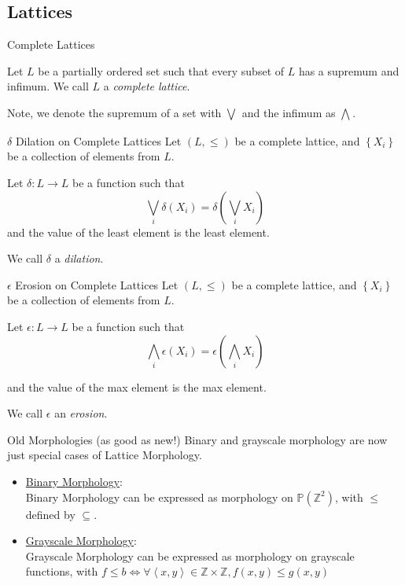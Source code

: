 \documentclass{beamer}
\newcommand{\set}[1]{\left\lbrace #1 \right\rbrace}
\newcommand{\tuple}[1]{\left\langle #1 \right\rangle}
\newcommand{\power}[1]{\mathbb{P}\left(#1\right)}
\newcommand{\integers}{\mathbb{Z}}
\newcommand{\func}[3]{#1:#2\rightarrow#3}
\newcommand{\meet}[1]{\displaystyle\bigwedge_{#1}}
\newcommand{\join}[1]{\displaystyle\bigvee_{#1}}
\newcommand{\unidilate}{\delta}
\newcommand{\unierode}{\epsilon}
\newcommand{\partialless}{\leqslant}
\begin{document}
\subsection{Lattices}
\begin{frame}{Complete Lattices}
  \begin{definition}
    Let $L$ be a partially ordered set such that 
    every subset of $L$ has a supremum and infimum. 
    We call $L$ a \emph{complete lattice}.
  \end{definition}
  Note, we denote the supremum of a set with $\join{}$ and
  the infimum as $\meet{}$.
\end{frame}

\begin{frame}{$\unidilate$ Dilation on Complete Lattices}
   Let $(L, \partialless)$ be a complete lattice, and $\set{X_i}$ be
   a collection of elements from $L$.
   \begin{definition}
     Let $\func{\unidilate}{L}{L}$ be a function such that
       $$\join{i} \unidilate(X_i) = 
         \unidilate\left(\join{i}X_i\right)$$
     and the value of the least element is the least element.


     We call $\unidilate$ a \emph{dilation}.
   \end{definition}
\end{frame}

\begin{frame}{$\unierode$ Erosion on Complete Lattices}
   Let $(L, \partialless)$ be a complete lattice, and $\set{X_i}$ be
   a collection of elements from $L$.
   \begin{definition}
     Let $\func{\unierode}{L}{L}$ be a function such that
       $$\meet{i} \unierode(X_i) = 
         \unierode\left(\meet{i}X_i\right)$$

     and the value of the max element is the max element.

     We call $\unierode$ an \emph{erosion}.
   \end{definition}
\end{frame}

\begin{frame}{Old Morphologies (as good as new!)}
  Binary and grayscale morphology are now just special cases of 
  Lattice Morphology.
  \begin{itemize}
    \item \underline{Binary Morphology}:\\
          Binary Morphology can be expressed as morphology on
          $\power{\integers^2}$, with $\partialless$ defined by $\subseteq$.
    \item \underline{Grayscale Morphology}:\\
          Grayscale Morphology can be expressed as morphology on
          grayscale functions, with 
          $f \partialless b \iff 
          \forall \tuple{x,y} \in \integers \times \integers,
          f(x,y) \leq g(x,y)$
  \end{itemize}
\end{frame}
\end{document}
